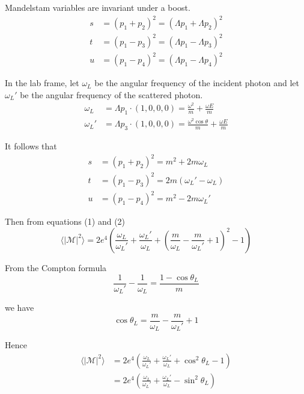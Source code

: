 \documentclass[12pt]{article}
\begin{document}
Mandelstam variables are invariant under a boost.
\begin{equation*}
\begin{aligned}
s&=(p_1+p_2)^2=(\Lambda p_1+\Lambda p_2)^2
\\
t&=(p_1-p_3)^2=(\Lambda p_1-\Lambda p_3)^2
\\
u&=(p_1-p_4)^2=(\Lambda p_1-\Lambda p_4)^2
\end{aligned}
\end{equation*}

In the lab frame, let $\omega_L$ be the angular frequency of the incident photon
and let $\omega_L'$ be the angular frequency of the scattered photon.
\begin{equation*}
\begin{aligned}
\omega_L&=\Lambda p_1\cdot(1,0,0,0)=\frac{\omega^2}{m}+\frac{\omega E}{m}
\\
\omega_L'&=\Lambda p_3\cdot(1,0,0,0)=\frac{\omega^2\cos\theta}{m}+\frac{\omega E}{m}
\end{aligned}
\end{equation*}

It follows that
\begin{equation*}
\begin{aligned}
s&=(p_1+p_2)^2=m^2+2m\omega_L
\\
t&=(p_1-p_3)^2=2m(\omega_L' - \omega_L)
\\
u&=(p_1-p_4)^2=m^2-2 m \omega_L'
\end{aligned}
\end{equation*}

Then from equations (1) and (2)
\begin{equation*}
\langle|\mathcal{M}|^2\rangle=
2e^4\left(
\frac{\omega_L}{\omega_L'}+\frac{\omega_L'}{\omega_L}
+\left(\frac{m}{\omega_L}-\frac{m}{\omega_L'}+1\right)^2-1
\right)
\end{equation*}

From the Compton formula
\begin{equation*}
\frac{1}{\omega_L'}-\frac{1}{\omega_L}=\frac{1-\cos\theta_L}{m}
\end{equation*}

we have
\begin{equation*}
\cos\theta_L=\frac{m}{\omega_L}-\frac{m}{\omega_L'}+1
\end{equation*}

Hence
\begin{align*}
\langle|\mathcal{M}|^2\rangle
&=2e^4\left(
\frac{\omega_L}{\omega_L'}+\frac{\omega_L'}{\omega_L}+\cos^2\theta_L-1
\right)
\\
&=2e^4\left(
\frac{\omega_L}{\omega_L'}+\frac{\omega_L'}{\omega_L}-\sin^2\theta_L
\right)
\end{align*}
\end{document}
